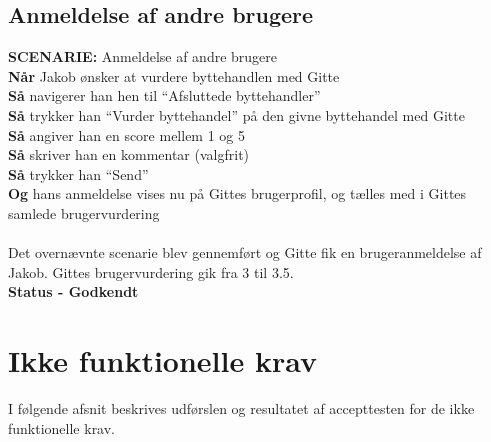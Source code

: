\subsection{Anmeldelse af andre brugere}
{\color{blue}\textbf{SCENARIE:}} Anmeldelse af andre brugere \\
{\color{blue}\textbf{Når}} Jakob ønsker at vurdere byttehandlen med Gitte\\
{\color{blue}\textbf{Så}} navigerer han hen til “Afsluttede byttehandler”\\
{\color{blue}\textbf{Så}} trykker han “Vurder byttehandel” på den givne byttehandel med Gitte\\
{\color{blue}\textbf{Så}} angiver han en score mellem 1 og 5\\
{\color{blue}\textbf{Så}} skriver han en kommentar (valgfrit)\\
{\color{blue}\textbf{Så}} trykker han “Send”\\
{\color{blue}\textbf{Og}} hans anmeldelse vises nu på Gittes brugerprofil, og tælles med i Gittes samlede brugervurdering
\\ \\
Det overnævnte scenarie blev gennemført og Gitte fik en brugeranmeldelse af Jakob. Gittes brugervurdering gik fra 3 til 3.5. \\
\textbf{Status - Godkendt}

\section{Ikke funktionelle krav}
I følgende afsnit beskrives udførslen og resultatet af accepttesten for de ikke funktionelle krav.

